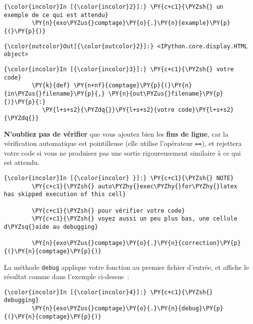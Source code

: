     \begin{Verbatim}[commandchars=\\\{\}]
{\color{incolor}In [{\color{incolor}2}]:} \PY{c+c1}{\PYZsh{} un exemple de ce qui est attendu}
        \PY{n}{exo\PYZus{}comptage}\PY{o}{.}\PY{n}{example}\PY{p}{(}\PY{p}{)}
\end{Verbatim}


\begin{Verbatim}[commandchars=\\\{\}]
{\color{outcolor}Out[{\color{outcolor}2}]:} <IPython.core.display.HTML object>
\end{Verbatim}
            
    \begin{Verbatim}[commandchars=\\\{\}]
{\color{incolor}In [{\color{incolor}3}]:} \PY{c+c1}{\PYZsh{} votre code}
        \PY{k}{def} \PY{n+nf}{comptage}\PY{p}{(}\PY{n}{in\PYZus{}filename}\PY{p}{,} \PY{n}{out\PYZus{}filename}\PY{p}{)}\PY{p}{:}
           \PY{l+s+s2}{\PYZdq{}}\PY{l+s+s2}{votre code}\PY{l+s+s2}{\PYZdq{}}
\end{Verbatim}


    \textbf{N'oubliez pas de vérifier} que vous ajoutez bien les
\textbf{fins de ligne}, car la vérification automatique est pointilleuse
(elle utilise l'opérateur \texttt{==}), et rejettera votre code si vous
ne produisez pas une sortie rigoureusement similaire à ce qui est
attendu.

    \begin{Verbatim}[commandchars=\\\{\}]
{\color{incolor}In [{\color{incolor} }]:} \PY{c+c1}{\PYZsh{} NOTE}
        \PY{c+c1}{\PYZsh{} auto\PYZhy{}exec\PYZhy{}for\PYZhy{}latex has skipped execution of this cell}
        
        \PY{c+c1}{\PYZsh{} pour vérifier votre code}
        \PY{c+c1}{\PYZsh{} voyez aussi un peu plus bas, une cellule d\PYZsq{}aide au debugging}
        
        \PY{n}{exo\PYZus{}comptage}\PY{o}{.}\PY{n}{correction}\PY{p}{(}\PY{n}{comptage}\PY{p}{)}
\end{Verbatim}


    La méthode \texttt{debug} applique votre fonction au premier fichier
d'entrée, et affiche le résultat comme dans l'exemple ci-dessus~:

    \begin{Verbatim}[commandchars=\\\{\}]
{\color{incolor}In [{\color{incolor}4}]:} \PY{c+c1}{\PYZsh{} debugging}
        \PY{n}{exo\PYZus{}comptage}\PY{o}{.}\PY{n}{debug}\PY{p}{(}\PY{n}{comptage}\PY{p}{)}
\end{Verbatim}


